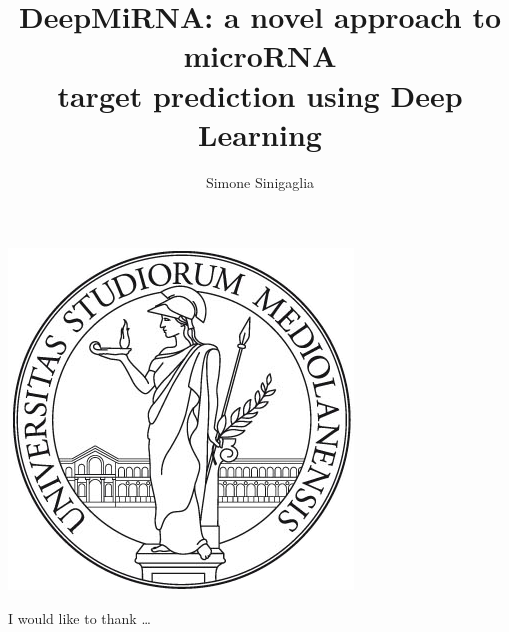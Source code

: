 \documentclass[
12pt, %
english, %
]{report} %
\begin{document}
	
	\title{DeepMiRNA: a novel approach to microRNA \\ 
		target prediction using Deep Learning}
	\author{Simone Sinigaglia}
	
	\begin{center}
		\includegraphics{Figures/logo_unimi}\\[1cm]
	\end{center}
	
	\beforepreface
	I would like to thank \dots
	\afterpreface
	
	
	
%
%

	
	
	
	
	
%
%
	
	\appendix %
	

%

	
	

\end{document}
